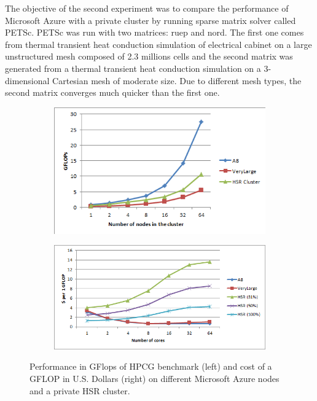 \documentclass[3p,times]{elsarticle}
\begin{document}
The objective of the second experiment was to compare the performance of Microsoft Azure with a private cluster by running sparse matrix solver called PETSc. PETSc was run with two matrices: ruep and nord. The first one comes from thermal transient heat conduction simulation of electrical cabinet on a large unstructured mesh composed of 2.3 millions cells and the second matrix was generated from a thermal transient heat conduction simulation on a 3-dimensional Cartesian mesh of moderate size. Due to different mesh types, the second matrix converges much quicker than the first one. 



\begin{figure}
\centering
\begin{subfigure}{.5\textwidth}
  \centering
			\includegraphics[width=\linewidth]{hpcg}	
  \label{fig:hpcg}
\end{subfigure}%
\begin{subfigure}{.5\textwidth}
  \centering
  \includegraphics[width=\linewidth]{cost}
  \label{fig:cost}
\end{subfigure}
\caption{Performance in GFlops of HPCG benchmark (left) and cost of a GFLOP in U.S. Dollars (right) on different Microsoft Azure nodes and a private HSR cluster. }
\end{figure}
\end{document}
